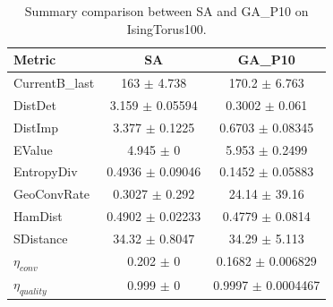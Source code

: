 \begin{table}[t]
\centering
\small
\begin{tabular}{lcc}
\toprule
Metric & SA & GA_P10 \\
\midrule
CurrentB\_last & 163 $\pm$ 4.738 & 170.2 $\pm$ 6.763 \\
DistDet & 3.159 $\pm$ 0.05594 & 0.3002 $\pm$ 0.061 \\
DistImp & 3.377 $\pm$ 0.1225 & 0.6703 $\pm$ 0.08345 \\
EValue & 4.945 $\pm$ 0 & 5.953 $\pm$ 0.2499 \\
EntropyDiv & 0.4936 $\pm$ 0.09046 & 0.1452 $\pm$ 0.05883 \\
GeoConvRate & 0.3027 $\pm$ 0.292 & 24.14 $\pm$ 39.16 \\
HamDist & 0.4902 $\pm$ 0.02233 & 0.4779 $\pm$ 0.0814 \\
SDistance & 34.32 $\pm$ 0.8047 & 34.29 $\pm$ 5.113 \\
$\eta_{conv}$ & 0.202 $\pm$ 0 & 0.1682 $\pm$ 0.006829 \\
$\eta_{quality}$ & 0.999 $\pm$ 0 & 0.9997 $\pm$ 0.0004467 \\
\bottomrule
\end{tabular}
\caption{Summary comparison between SA and GA_P10 on IsingTorus100.}
\label{tab:comparison_SA_GA_P10_IsingTorus100}
\end{table}
